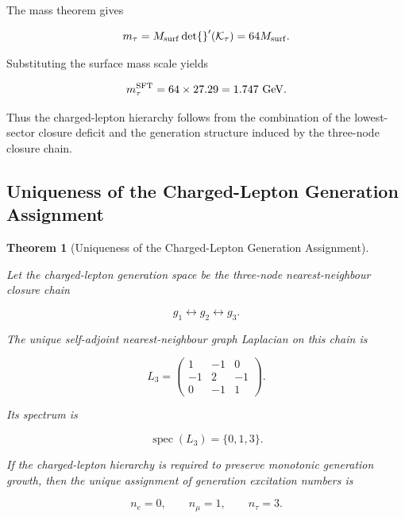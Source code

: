 \documentclass[11pt]{article}
\newtheorem{theorem}{Theorem}[section]
\theoremstyle{definition}
\theoremstyle{remark}
\begin{document}
The mass theorem gives

\begin{equation}
m_\tau = 
M_{\rm surf}
\det{}'(\mathcal K_\tau) = 
64M_{\rm surf}.
\end{equation}

Substituting the surface mass scale yields

\begin{equation}
m_\tau^{\rm SFT} = 64\times27.29 =
1.747~{\rm GeV}.
\label{eq:tau_mass_sft}
\end{equation}

Thus the charged-lepton hierarchy follows from the combination
of the lowest-sector closure deficit and the generation
structure induced by the three-node closure chain.


\subsection{Uniqueness of the Charged-Lepton Generation Assignment}
\label{subsec:charged_lepton_generation_uniqueness}

\begin{theorem}[Uniqueness of the Charged-Lepton Generation Assignment]
\label{thm:charged_lepton_generation_uniqueness}

Let the charged-lepton generation space be the three-node
nearest-neighbour closure chain

\begin{equation}
g_1
\longleftrightarrow
g_2
\longleftrightarrow
g_3.
\end{equation}

The unique self-adjoint nearest-neighbour graph Laplacian on
this chain is

\begin{equation}
L_3
=
\begin{pmatrix}
1 & -1 & 0 \\
-1 & 2 & -1 \\
0 & -1 & 1
\end{pmatrix}.
\end{equation}

Its spectrum is

\begin{equation}
\operatorname{spec}(L_3)
=
\{0,1,3\}.
\end{equation}

If the charged-lepton hierarchy is required to preserve
monotonic generation growth, then the unique assignment of
generation excitation numbers is

\begin{equation}
n_e=0,
\qquad
n_\mu=1,
\qquad
n_\tau=3.
\end{equation}

\end{theorem}
\end{document}

